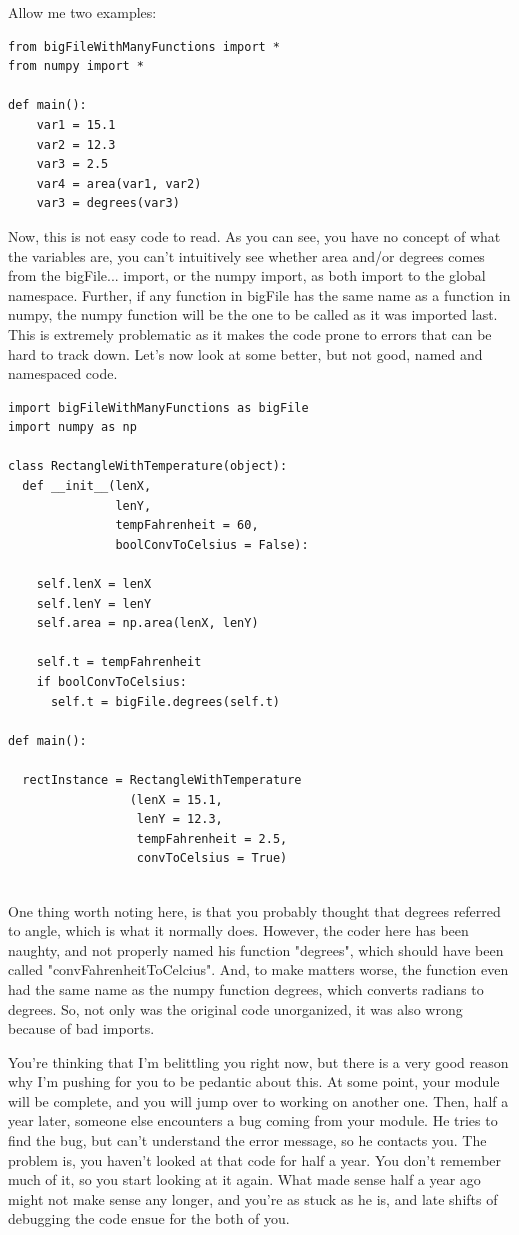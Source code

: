 \documentclass[10pt,a4paper]{article}
\begin{document}
Allow me two examples:
\begin{lstlisting}
from bigFileWithManyFunctions import *
from numpy import *

def main():
	var1 = 15.1
	var2 = 12.3
	var3 = 2.5
	var4 = area(var1, var2)
	var3 = degrees(var3)

\end{lstlisting}

Now, this is not easy code to read. As you can see, you have no concept of what the variables are, you can't intuitively see whether area and/or degrees comes from the bigFile... import, or the numpy import, as both import to the global namespace. Further, if any function in bigFile has the same name as a function in numpy, the numpy function will be the one to be called as it was imported last. This is extremely problematic as it makes the code prone to errors that can be hard to track down. Let's now look at some better, but not good, named and namespaced code.

\begin{lstlisting}
import bigFileWithManyFunctions as bigFile
import numpy as np

class RectangleWithTemperature(object):
  def __init__(lenX, 
               lenY, 
               tempFahrenheit = 60, 
               boolConvToCelsius = False):
               
    self.lenX = lenX
    self.lenY = lenY
    self.area = np.area(lenX, lenY)
		
    self.t = tempFahrenheit
    if boolConvToCelsius:
      self.t = bigFile.degrees(self.t)

def main():

  rectInstance = RectangleWithTemperature
                 (lenX = 15.1, 
                  lenY = 12.3, 
                  tempFahrenheit = 2.5, 
                  convToCelsius = True)
	
\end{lstlisting}

One thing worth noting here, is that you probably thought that degrees referred to angle, which is what it normally does. However, the coder here has been naughty, and not properly named his function "degrees", which should have been called "convFahrenheitToCelcius". And, to make matters worse, the function even had the same name as the numpy function degrees, which converts radians to degrees. So, not only was the original code unorganized, it was also wrong because of bad imports.

You're thinking that I'm belittling you right now, but there is a very good reason why I'm pushing for you to be pedantic about this. At some point, your module will be complete, and you will jump over to working on another one. Then, half a year later, someone else encounters a bug coming from your module. He tries to find the bug, but can't understand the error message, so he contacts you. The problem is, you haven't looked at that code for half a year. You don't remember much of it, so you start looking at it again. What made sense half a year ago might not make sense any longer, and you're as stuck as he is, and late shifts of debugging the code ensue for the both of you. 
\end{document}
